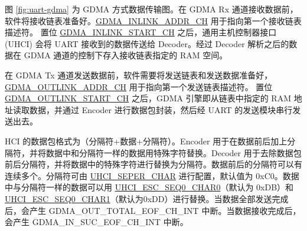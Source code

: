 \documentclass[main\_\_CN.tex]{subfiles}
\begin{document}
图 \ref{fig:uart-gdma} 为 GDMA 方式数据传输图。在 GDMA Rx 通道接收数据前，软件将接收链表准备好。\hyperref[fielddesc:GDMAINLINKADDRCHN]{GDMA\_INLINK\_ADDR\_CH} 用于指向第一个接收链表描述符。 置位 \hyperref[fielddesc:GDMAINLINKSTARTCHN]{GDMA\_INLINK\_START\_CH} 之后，通用主机控制器接口 (UHCI) 会将 UART 接收到的数据传送给 Decoder。经过 Decoder 解析之后的数据在 GDMA 通道的控制下存入接收链表指定的 RAM 空间。

在 GDMA Tx 通道发送数据前，软件需要将发送链表和发送数据准备好，\hyperref[fielddesc:GDMAOUTLINKADDRCHN]{GDMA\_OUTLINK\_ADDR\_CH} 用于指向第一个发送链表描述符。 置位 \hyperref[fielddesc:GDMAOUTLINKSTARTCHN]{GDMA\_OUTLINK\_START\_CH} 之后，GDMA 引擎即从链表中指定的 RAM 地址读取数据，并通过 Encoder 进行数据包封装，然后经 UART 的发送模块串行发送出去。

HCI 的数据包格式为（分隔符+数据+分隔符）。Encoder 用于在数据前后加上分隔符，并将数据中和分隔符一样的数据用特殊字符替换。Decoder 用于去除数据包前后分隔符，并将数据中的特殊字符进行替换为分隔符。数据前后的分隔符可以有连续多个。分隔符可由 \hyperref[fielddesc:UHCISEPERCHAR]{UHCI\_SEPER\_CHAR} 进行配置，默认值为 0xC0。数据中与分隔符一样的数据可以用 \hyperref[fielddesc:UHCIESCSEQ0CHAR0]{UHCI\_ESC\_SEQ0\_CHAR0}（默认为 0xDB）和 \hyperref[fielddesc:UHCIESCSEQ0CHAR1]{UHCI\_ESC\_SEQ0\_CHAR1}（默认为0xDD）进行替换。当数据全部发送完成后，会产生 GDMA\_OUT\_TOTAL\_EOF\_CH\_INT 中断。当数据接收完成后，会产生 GDMA\_IN\_SUC\_EOF\_CH\_INT 中断。
\end{document}
